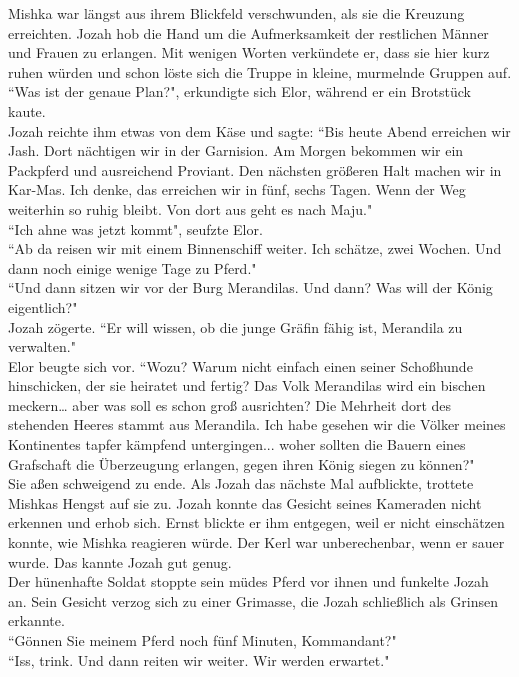 Mishka war längst aus ihrem Blickfeld verschwunden, als sie die Kreuzung erreichten. Jozah hob die 
Hand um die Aufmerksamkeit der restlichen Männer und Frauen zu erlangen. Mit wenigen Worten 
verkündete er, dass sie hier kurz ruhen würden und schon löste sich die Truppe in kleine, murmelnde 
Gruppen auf. \\ 
``Was ist der genaue Plan?", erkundigte sich Elor, während er ein Brotstück kaute. \\
Jozah reichte ihm etwas von dem Käse und sagte: ``Bis heute Abend erreichen wir Jash. Dort 
nächtigen wir in der Garnision. Am Morgen bekommen wir ein Packpferd und ausreichend Proviant. Den 
nächsten größeren Halt machen wir in Kar-Mas. Ich denke, das erreichen wir in fünf, sechs Tagen. 
Wenn der Weg weiterhin so ruhig bleibt. Von dort aus geht es nach Maju."\\
``Ich ahne was jetzt kommt", seufzte Elor.\\
``Ab da reisen wir mit einem Binnenschiff weiter. Ich schätze, zwei Wochen. Und dann noch einige 
wenige Tage zu Pferd."\\
``Und dann sitzen wir vor der Burg Merandilas. Und dann? Was will der König eigentlich?"\\
Jozah zögerte. ``Er will wissen, ob die junge Gräfin fähig ist, Merandila zu verwalten."\\
Elor beugte sich vor. ``Wozu? Warum nicht einfach einen seiner Schoßhunde hinschicken, der sie 
heiratet und fertig? Das Volk Merandilas wird ein bischen meckern… aber was soll es schon groß 
ausrichten? Die Mehrheit dort des stehenden Heeres stammt aus Merandila. Ich habe gesehen wir die 
Völker meines Kontinentes tapfer kämpfend untergingen... woher sollten die Bauern eines Grafschaft 
die Überzeugung erlangen, gegen ihren König siegen zu können?"\\
Sie aßen schweigend zu ende. Als Jozah das nächste Mal aufblickte, trottete Mishkas Hengst auf sie 
zu. Jozah konnte das Gesicht seines Kameraden nicht erkennen und erhob sich. Ernst blickte er ihm 
entgegen, weil er nicht einschätzen konnte, wie Mishka reagieren würde. Der Kerl war unberechenbar, 
wenn er sauer wurde. Das kannte Jozah gut genug.\\
Der hünenhafte Soldat stoppte sein müdes Pferd vor ihnen und funkelte Jozah an. Sein Gesicht verzog 
sich zu einer Grimasse, die Jozah schließlich als Grinsen erkannte. \\
``Gönnen Sie meinem Pferd noch fünf Minuten, Kommandant?"\\
``Iss, trink. Und dann reiten wir weiter. Wir werden erwartet."\\
